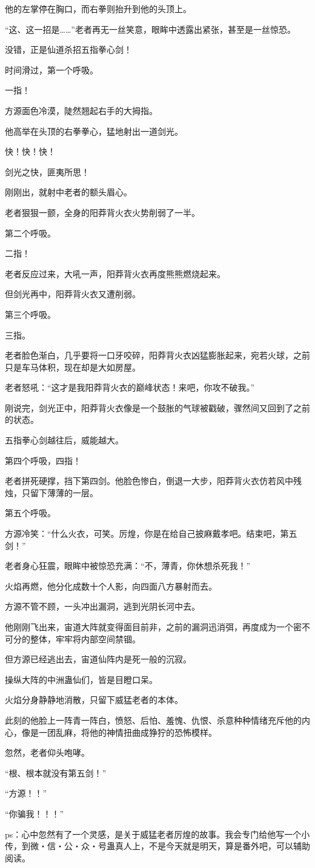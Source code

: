 \begin{this_body}
他的左掌停在胸口，而右拳则抬升到他的头顶上。

“这、这一招是……”老者再无一丝笑意，眼眸中透露出紧张，甚至是一丝惊恐。

没错，正是仙道杀招五指拳心剑！

时间滑过，第一个呼吸。

一指！

方源面色冷漠，陡然翘起右手的大拇指。

他高举在头顶的右拳拳心，猛地射出一道剑光。

快！快！快！

剑光之快，匪夷所思！

刚刚出，就射中老者的额头眉心。

老者狠狠一颤，全身的阳莽背火衣火势削弱了一半。

第二个呼吸。

二指！

老者反应过来，大吼一声，阳莽背火衣再度熊熊燃烧起来。

但剑光再中，阳莽背火衣又遭削弱。

第三个呼吸。

三指。

老者脸色渐白，几乎要将一口牙咬碎，阳莽背火衣凶猛膨胀起来，宛若火球，之前只是车马体积，现在却是大如房屋。

老者怒吼：“这才是我阳莽背火衣的巅峰状态！来吧，你攻不破我。”

刚说完，剑光正中，阳莽背火衣像是一个鼓胀的气球被戳破，骤然间又回到了之前的状态。

五指拳心剑越往后，威能越大。

第四个呼吸，四指！

老者拼死硬撑，挡下第四剑。他脸色惨白，倒退一大步，阳莽背火衣仿若风中残烛，只留下薄薄的一层。

第五个呼吸。

方源冷笑：“什么火衣，可笑。厉煌，你是在给自己披麻戴孝吧。结束吧，第五剑！”

老者身心狂震，眼眸中被惊恐充满：“不，薄青，你休想杀死我！”

火焰再燃，他分化成数十个人影，向四面八方暴射而去。

方源不管不顾，一头冲出漏洞，逃到光阴长河中去。

他刚刚飞出来，宙道大阵就变得面目前非，之前的漏洞迅消弭，再度成为一个密不可分的整体，牢牢将内部空间禁锢。

但方源已经逃出去，宙道仙阵内是死一般的沉寂。

操纵大阵的中洲蛊仙们，皆是目瞪口呆。

火焰分身静静地消散，只留下威猛老者的本体。

此刻的他脸上一阵青一阵白，愤怒、后怕、羞愧、仇恨、杀意种种情绪充斥他的内心，像是一团乱麻，将他的神情扭曲成狰狞的恐怖模样。

忽然，老者仰头咆哮。

“根、根本就没有第五剑！”

“方源！！”

“你骗我！！！”

ps：心中忽然有了一个灵感，是关于威猛老者厉煌的故事。我会专门给他写一个小传，到微・信・公・众・号蛊真人上，不是今天就是明天，算是番外吧，可以辅助阅读。

\end{this_body}

